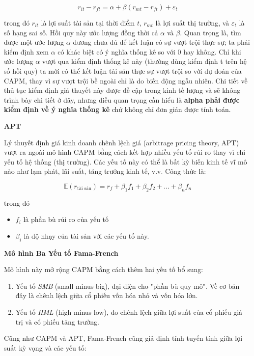 $$
r_{it} - r_{ft} = \alpha + \beta(r_{mt} - r_{ft}) + \varepsilon_t
$$

trong đó $r_{it}$ là lợi suất tài sản tại thời điểm $t$, $r_{mt}$ là lợi suất thị trường, và $\varepsilon_t$ là số hạng sai số. Hồi quy này ước lượng đồng thời cả $\alpha$ và $\beta$. Quan trọng là, tìm được một ước lượng $\alpha$ dương chưa đủ để kết luận có sự vượt trội thực sự; ta phải kiểm định xem $\alpha$ có khác biệt có ý nghĩa thống kê so với 0 hay không. Chỉ khi ước lượng $\alpha$ vượt qua kiểm định thống kê này (thường dùng kiểm định t trên hệ số hồi quy) ta mới có thể kết luận tài sản thực sự vượt trội so với dự đoán của CAPM, thay vì sự vượt trội bề ngoài chỉ là do biến động ngẫu nhiên. Chi tiết về thủ tục kiểm định giả thuyết này được đề cập trong kinh tế lượng và sẽ không trình bày chi tiết ở đây, nhưng điều quan trọng cần hiểu là \textbf{alpha phải được kiểm định về ý nghĩa thống kê} chứ không chỉ đơn giản được tính toán.

\textbf{APT}

Lý thuyết định giá kinh doanh chênh lệch giá (arbitrage pricing theory, APT) vượt ra ngoài mô hình CAPM bằng cách kết hợp nhiều yếu tố rủi ro thay vì chỉ yếu tố hệ thống (thị trường). Các yếu tố này có thể là bất kỳ biến kinh tế vĩ mô nào như lạm phát, lãi suất, tăng trưởng kinh tế, v.v. Công thức là:

$$
\mathbb{E}(r_{\text{tài sản}}) = r_{f} + \beta_{1} f_{1} + \beta_{2} f_{2}+ \dots + \beta_{n} f_{n}
$$

trong đó
\begin{itemize}
  \item $f_{i}$ là phần bù rủi ro của yếu tố
  \item $\beta_{i}$ là độ nhạy của tài sản với các yếu tố này.
\end{itemize}

\textbf{Mô hình Ba Yếu tố Fama-French}

Mô hình này mở rộng CAPM bằng cách thêm hai yếu tố bổ sung:
\begin{enumerate}
  \item Yếu tố \emph{SMB} (small minus big), đại diện cho "phần bù quy mô". Về cơ bản đây là chênh lệch giữa cổ phiếu vốn hóa nhỏ và vốn hóa lớn.
  \item Yếu tố \emph{HML} (high minus low), đo chênh lệch giữa lợi suất của cổ phiếu giá trị và cổ phiếu tăng trưởng.
\end{enumerate}

Cũng như CAPM và APT, Fama-French cũng giả định tính tuyến tính giữa lợi suất kỳ vọng và các yếu tố:

